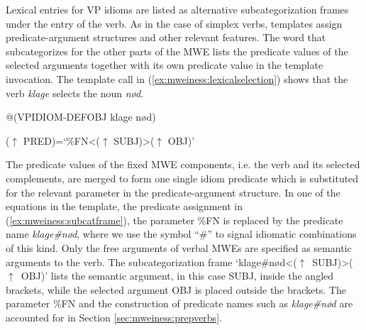 \documentclass[output=paper]{langsci/langscibook}
\begin{document}
Lexical entries for VP idioms are listed as alternative subcategorization frames under the entry of the verb.
As in the case of simplex verbs, templates assign predicate-argument structures and other relevant features.  
The word that subcategorizes for the other parts of the MWE lists the predicate values of the selected arguments together with its own predicate value in the template invocation. 
The template call in (\ref{ex:mweiness:lexicalselection}) shows that the verb \emph{klage} selects the noun \emph{nød}. 

\ea\label{ex:mweiness:lexicalselection}
{\small 
@(VPIDIOM-DEFOBJ klage nød)
}
\z

\ea\label{ex:mweiness:subcatframe}
{\small
	  ($\uparrow$ PRED)=`\%FN<($\uparrow$ SUBJ)>($\uparrow$ OBJ)'  \\
}
\z



The predicate values of the fixed MWE components, i.e. the verb and its selected complements, are merged to form one single idiom predicate which is substituted for the relevant parameter in the predicate-argument structure.
In one of the equations in the template, the predicate assignment in (\ref{ex:mweiness:subcatframe}),  the parameter \%FN is replaced by the predicate name \emph{klage\#nød}, where we use the symbol ``\#'' to signal idiomatic combinations of this kind.
Only the free arguments of verbal MWEs are specified as semantic arguments to the verb.
The subcategorization frame `klage\#nød<($\uparrow$~SUBJ)>($\uparrow$~OBJ)' lists the semantic argument, in this case SUBJ, inside the angled brackets, while the selected argument OBJ is placed outside the brackets.
The parameter \%FN and the construction of predicate names such as \emph{klage\#nød} are accounted for in Section \ref{sec:mweiness:prepverbs}.  
\end{document}
